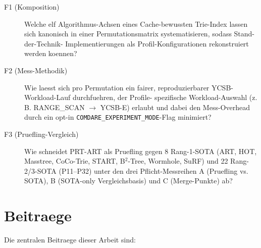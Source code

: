 \begin{description}
    \item[F1 (Komposition)] Welche elf Algorithmus-Achsen eines
          Cache-bewussten Trie-Index lassen sich kanonisch in einer
          Permutationsmatrix systematisieren, sodass Stand-der-Technik-
          Implementierungen als Profil-Konfigurationen rekonstruiert
          werden koennen?

    \item[F2 (Mess-Methodik)] Wie laesst sich pro Permutation ein fairer,
          reproduzierbarer YCSB-Workload-Lauf durchfuehren, der Profile-
          spezifische Workload-Auswahl (z.\,B. RANGE\_SCAN $\to$ YCSB-E)
          erlaubt und dabei den Mess-Overhead durch ein opt-in
          \texttt{COMDARE\_EXPERIMENT\_MODE}-Flag minimiert?

    \item[F3 (Pruefling-Vergleich)] Wie schneidet PRT-ART als Pruefling
          gegen 8 Rang-1-SOTA (ART, HOT, Masstree, CoCo-Trie, START,
          B$^2$-Tree, Wormhole, SuRF) und 22 Rang-2/3-SOTA (P11--P32)
          unter den drei Pflicht-Messreihen A (Pruefling vs. SOTA),
          B (SOTA-only Vergleichsbasis) und C (Merge-Punkte) ab?
\end{description}

\section{Beitraege}

Die zentralen Beitraege dieser Arbeit sind:

